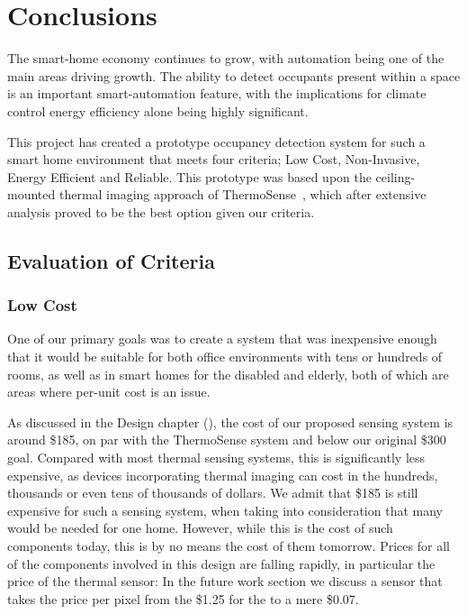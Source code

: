 \documentclass[../thesis/thesis.tex]{subfiles}
\begin{document}
 \chapter{Conclusions}

The smart-home economy continues to grow, with automation being one of the main areas driving growth. The ability to detect occupants present within a space is an important smart-automation feature, with the implications for climate control energy efficiency alone being highly significant.

This project has created a prototype occupancy detection system for such a smart home environment that meets four criteria; Low Cost, Non-Invasive, Energy Efficient and Reliable. This prototype was based upon the ceiling-mounted thermal imaging approach of ThermoSense~\cite{beltran2013thermosense}, which after extensive analysis proved to be the best option given our criteria.

\section{Evaluation of Criteria}

\subsection{Low Cost}
One of our primary goals was to create a system that was inexpensive enough that it would be suitable for both office environments with tens or hundreds of rooms, as well as in smart homes for the disabled and elderly, both of which are areas where per-unit cost is an issue.

As discussed in the Design chapter (), the cost of our proposed sensing system is around \$185, on par with the ThermoSense system and below our original \$300 goal. Compared with most thermal sensing systems, this is significantly less expensive, as devices incorporating thermal imaging can cost in the hundreds, thousands or even tens of thousands of dollars. We admit that \$185 is still expensive for such a sensing system, when taking into consideration that many would be needed for one home. However, while this is the cost of such components today, this is by no means the cost of them tomorrow. Prices for all of the components involved in this design are falling rapidly, in particular the price of the thermal sensor: In the future work section we discuss a sensor that takes the price per pixel from the \$1.25 for the \mlx to a mere \$0.07.
\end{document}
